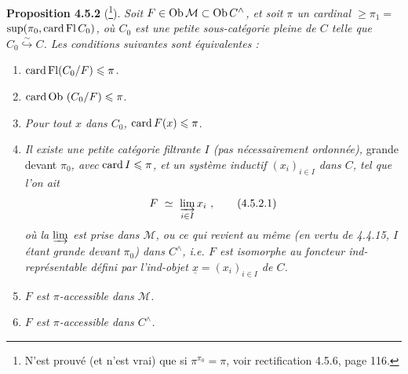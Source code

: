 \textbf{Proposition 4.5.2} (\footnote{N'est prouvé (et n'est vrai) que si $\pi^{\pi_0} = \pi$, voir rectification 4.5.6, page 116.}). \textit{Soit $F \in \mathrm{Ob}\,\mathcal{M} \subset \mathrm{Ob}\, C^{\wedge}$, et soit $\pi$ un cardinal $\geqslant \pi_1 =$} $\sup(\pi_0, \operatorname{card}\operatorname{Fl} C_0)$\textit{, où $C_0$ est une petite sous-catégorie pleine de $C$ telle que $C_0 \overset{\sim}{\hookrightarrow} C$. Les conditions suivantes sont équivalentes :}
\begin{enumerate}[leftmargin=3em]
\item[\textit{a)}] $\operatorname{card}\operatorname{Fl}(C_0/F) \leqslant \pi$.
\item[\textit{a$'$)}] $\operatorname{card}\mathrm{Ob}\,\,(C_0/F) \leqslant \pi$.
\item[\textit{a$''$)}] \textit{Pour tout $x$ dans $C_0$,} $\operatorname{card} F(x) \leqslant \pi$.
\item[\textit{b)}] \textit{Il existe une petite catégorie filtrante $I$ (pas nécessairement ordonnée),} grande devant $\pi_0$\textit{, avec} $\operatorname{card} I \leqslant \pi$\textit{, et un système inductif $(x_i)_{i\in I}$ dans $C$, tel que l'on ait}
\[
F \ \simeq\ \varinjlim_{i\in I} x_i\ ,
\tag*{(4.5.2.1)}
\]
\textit{où la $\varinjlim$ est prise dans $\mathcal{M}$, ou ce qui revient au même (en vertu de 4.4.15, $I$ étant grande devant $\pi_0$) dans $C^{\wedge}$, i.e. $F$ est isomorphe au foncteur ind-représentable défini par l'ind-objet $\underline{x} = (x_i)_{i\in I}$ de $C$.}
\item[\textit{c)}] \textit{$F$ est $\pi$-accessible dans $\mathcal{M}$.}
\item[\textit{c$'$)}] \textit{$F$ est $\pi$-accessible dans $C^{\wedge}$.}
\end{enumerate}

